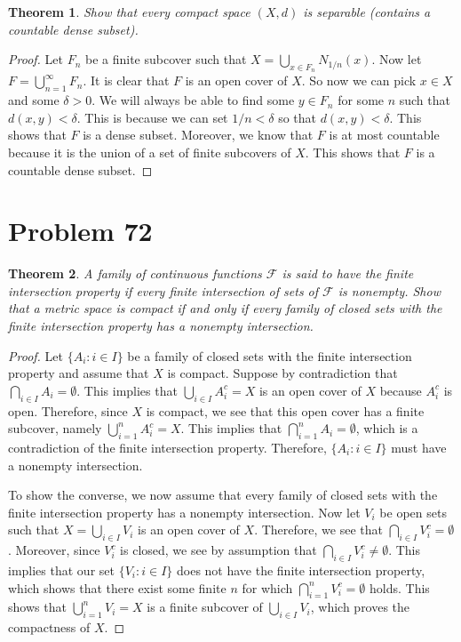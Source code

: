 \documentclass[psamsfonts]{amsart}
\newtheorem{thm}{Theorem}[section]
\theoremstyle{definition}
\theoremstyle{remark}
\numberwithin{equation}{section}
\begin{document}
\begin{thm}
Show that every compact space $(X,d)$ is separable (contains a countable dense subset). 
\end{thm}

\begin{proof}
Let $F_n$ be a finite subcover such that $X = \bigcup_{x \in F_n} N_{1/n} (x)$. Now let $F = \bigcup_{n=1}^\infty F_n$. It is clear that $F$ is an open cover of $X$. So now we can pick $x \in X$ and some $\delta > 0$. We will always be able to find some $y \in F_n$ for some $n$ such that $d(x,y) < \delta$. This is because we can set $1/n < \delta$ so that $d(x,y) < \delta$. This shows that $F$ is a dense subset. Moreover, we know that $F$ is at most countable because it is the union of a set of finite subcovers of $X$. This shows that $F$ is a countable dense subset.
\end{proof}

\section{Problem 72}

\begin{thm}
A family of continuous functions $\mathscr{F}$ is said to have the finite intersection property if every finite intersection of sets of $\mathscr{F}$ is nonempty. Show that a metric space is compact if and only if every family of closed sets with the finite intersection property has a nonempty intersection. 
\end{thm}

\begin{proof}
Let $\{ A_i: i \in I \}$ be a family of closed sets with the finite intersection property and assume that $X$ is compact. Suppose by contradiction that $\bigcap_{i \in I} A_i = \emptyset$. This implies that $\bigcup_{i \in I} A_i^c = X$ is an open cover of $X$ because $A_i^c$ is open. Therefore, since $X$ is compact, we see that this open cover has a finite subcover, namely $\bigcup_{i=1}^n A_i^c = X$. This implies that $\bigcap_{i=1}^n A_i = \emptyset$, which is a contradiction of the finite intersection property. Therefore, $\{ A_i : i \in I \}$ must have a nonempty intersection.   

To show the converse, we now assume that every family of closed sets with the finite intersection property has a nonempty intersection. Now let $V_i$ be open sets such that $X = \bigcup_{i \in I} V_i$ is an open cover of $X$. Therefore, we see that $\bigcap_{i \in I} V_i^c = \emptyset$. Moreover, since $V_i^c$ is closed, we see by assumption that $\bigcap_{i \in I} V_i^c \neq \emptyset$. This implies that our set $\{ V_i : i \in I \}$ does not have the finite intersection property, which shows that there exist some finite $n$ for which $\bigcap_{i=1}^n V_i^c = \emptyset$ holds. This shows that $\bigcup_{i=1}^n V_i = X$ is a finite subcover of $\bigcup_{i \in I} V_i$, which proves the compactness of $X$. 
\end{proof}
\end{document}
